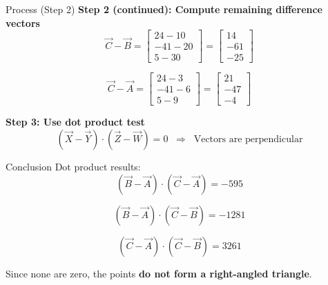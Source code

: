 \documentclass{beamer}
\begin{document}
\begin{frame}{Process (Step 2)}
\textbf{Step 2 (continued): Compute remaining difference vectors} \\
\begin{equation}
\vec{C}-\vec{B} =
\begin{bmatrix}24-10\\-41-20\\5-30\end{bmatrix} =
\begin{bmatrix}14\\-61\\-25\end{bmatrix}
\end{equation}

\begin{equation}
\vec{C}-\vec{A} =
\begin{bmatrix}24-3\\-41-6\\5-9\end{bmatrix} =
\begin{bmatrix}21\\-47\\-4\end{bmatrix}
\end{equation}

\textbf{Step 3: Use dot product test} \\
\begin{equation}
(\vec{X}-\vec{Y}) \cdot (\vec{Z}-\vec{W}) = 0 
\;\;\Rightarrow\;\; \text{Vectors are perpendicular}
\end{equation}
\end{frame}

\begin{frame}{Conclusion}
Dot product results: \\
\begin{equation}
(\vec{B}-\vec{A}) \cdot (\vec{C}-\vec{A}) = -595
\end{equation}

\begin{equation}
(\vec{B}-\vec{A}) \cdot (\vec{C}-\vec{B}) = -1281
\end{equation}

\begin{equation}
(\vec{C}-\vec{A}) \cdot (\vec{C}-\vec{B}) = 3261
\end{equation}

Since none are zero, the points \textbf{do not form a right-angled triangle}.
\end{frame}
\end{document}
